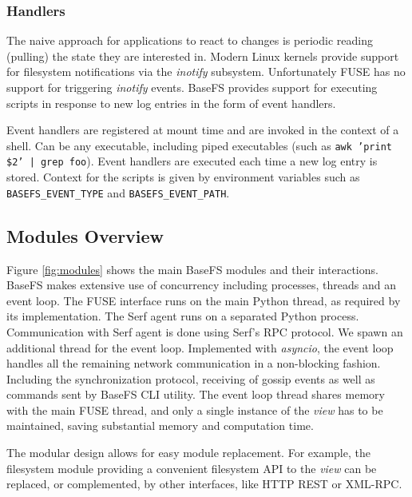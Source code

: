 \documentclass{sig-alternate}
\begin{document}
\subsubsection{Handlers}\label{handlers}
The naive approach for applications to react to changes is periodic reading (pulling) the state they are interested in. Modern Linux kernels provide support for filesystem notifications via the \textit{inotify} subsystem. Unfortunately FUSE has no support for triggering \textit{inotify} events. BaseFS provides support for executing scripts in response to new log entries in the form of event handlers.

Event handlers are registered at mount time and are invoked in the context of a shell. Can be any executable, including piped executables (such as \texttt{awk '{print \$2}' | grep foo}). Event handlers are executed each time a new log entry is stored. Context for the scripts is given by environment variables such as \texttt{BASEFS\_EVENT\_TYPE} and \texttt{BASEFS\_EVENT\_PATH}.

\subsection{Modules Overview}\label{modules}

Figure \ref{fig:modules} shows the main BaseFS modules and their interactions. BaseFS makes extensive use of concurrency including processes, threads and an event loop. The FUSE interface runs on the main Python thread, as required by its implementation. The Serf agent runs on a separated Python process. Communication with Serf agent is done using Serf's RPC protocol. We spawn an additional thread for the event loop. Implemented with \textit{asyncio}, the event loop handles all the remaining network communication in a non-blocking fashion. Including the synchronization protocol, receiving of gossip events as well as commands sent by BaseFS CLI utility. The event loop thread shares memory with the main FUSE thread, and only a single instance of the \textit{view} has to be maintained, saving substantial memory and computation time.

The modular design allows for easy module replacement. For example, the filesystem module providing a convenient filesystem API to the \textit{view} can be replaced, or complemented, by other interfaces, like HTTP REST or XML-RPC.
\end{document}
